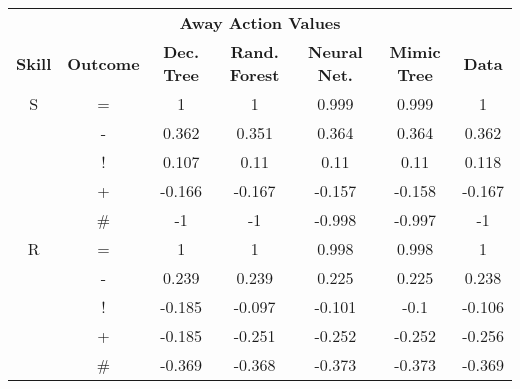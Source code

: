 \documentclass{sfuthesis}
\begin{document}
\begin{table}[]
	\centering
	\begin{tabular}{ccccccc}
		\multicolumn{7}{c}{\textbf{Away Action Values}}                                                                                                                                       \\
		\textbf{Skill} & \multicolumn{1}{c|}{\textbf{Outcome}} & \textbf{Dec. Tree} & \textbf{Rand. Forest} & \textbf{Neural Net.} & \multicolumn{1}{c|}{\textbf{Mimic Tree}} & \textbf{Data} \\ \hline
		S              & \multicolumn{1}{c|}{=}                & 1                  & 1                     & 0.999                & \multicolumn{1}{c|}{0.999}               & 1             \\
		& \multicolumn{1}{c|}{-}                & 0.362              & 0.351                 & 0.364                & \multicolumn{1}{c|}{0.364}               & 0.362         \\
		& \multicolumn{1}{c|}{!}                & 0.107              & 0.11                  & 0.11                 & \multicolumn{1}{c|}{0.11}                & 0.118         \\
		& \multicolumn{1}{c|}{+}                & -0.166             & -0.167                & -0.157               & \multicolumn{1}{c|}{-0.158}              & -0.167        \\
		& \multicolumn{1}{c|}{\#}               & -1                 & -1                    & -0.998               & \multicolumn{1}{c|}{-0.997}              & -1            \\ \hline
		R              & \multicolumn{1}{c|}{=}                & 1                  & 1                     & 0.998                & \multicolumn{1}{c|}{0.998}               & 1             \\
		& \multicolumn{1}{c|}{-}                & 0.239              & 0.239                 & 0.225                & \multicolumn{1}{c|}{0.225}               & 0.238         \\
		& \multicolumn{1}{c|}{!}                & -0.185             & -0.097                & -0.101               & \multicolumn{1}{c|}{-0.1}                & -0.106        \\
		& \multicolumn{1}{c|}{+}                & -0.185             & -0.251                & -0.252               & \multicolumn{1}{c|}{-0.252}              & -0.256        \\
		& \multicolumn{1}{c|}{\#}               & -0.369             & -0.368                & -0.373               & \multicolumn{1}{c|}{-0.373}              & -0.369        \\ \hline

\end{tabular}
\end{table}
\end{document}
